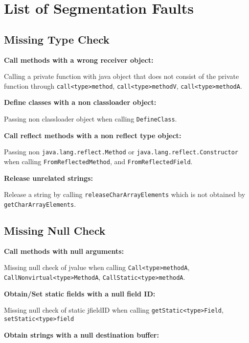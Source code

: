 \documentclass[10pt]{article}
\begin{document}
\section{List of Segmentation Faults} 

\subsection{Missing Type Check}
\noindent \textbf{Call methods with a wrong receiver object:} 

Calling a private function with java object that does not consist of the private function through {\tt call<type>method}, {\tt call<type>methodV}, {\tt call<type>methodA}.

\vspace{3mm}
\noindent \textbf{Define classes with a non classloader object:}

Passing non classloader object when calling {\tt DefineClass}.

\vspace{3mm}
\noindent \textbf{Call reflect methods with a non reflect type object:}

Passing non {\tt java.lang.reflect.Method} or {\tt java.lang.reflect.Constructor} when calling {\tt FromReflectedMethod}, and {\tt FromReflectedField}.

\vspace{3mm}
\noindent \textbf{Release unrelated strings:}

Release a string by calling {\tt releaseCharArrayElements} which is not obtained by {\tt getCharArrayElements}.

\subsection{Missing Null Check}

\vspace{3mm}
\noindent \textbf{Call methods with null arguments:}

Missing null check of jvalue when calling {\tt Call<type>methodA}, {\tt CallNonvirtual<type>MethodA}, {\tt CallStatic<type>methodA}.

\vspace{3mm}
\noindent \textbf{Obtain/Set static fields with a null field ID:}

Missing null check of static jfieldID when calling {\tt getStatic<type>Field}, {\tt setStatic<type>field}

\vspace{3mm}
\noindent \textbf{Obtain strings with a null destination buffer:}
\end{document}
